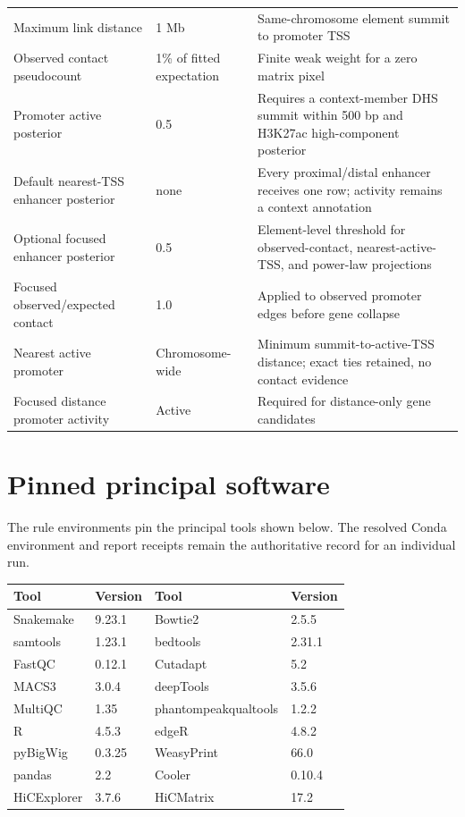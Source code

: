 \documentclass[11pt]{article}
\begin{document}
\begin{longtable}{p{} p{} p{}}
Maximum link distance & 1 Mb & Same-chromosome element summit to promoter TSS \\
Observed contact pseudocount & 1\% of fitted expectation & Finite weak weight for a zero matrix pixel \\
Promoter active posterior & 0.5 & Requires a context-member DHS summit within 500 bp and H3K27ac high-component posterior \\
Default nearest-TSS enhancer posterior & none & Every proximal/distal enhancer receives one row; activity remains a context annotation \\
Optional focused enhancer posterior & 0.5 & Element-level threshold for observed-contact, nearest-active-TSS, and power-law projections \\
Focused observed/expected contact & 1.0 & Applied to observed promoter edges before gene collapse \\
Nearest active promoter & Chromosome-wide & Minimum summit-to-active-TSS distance; exact ties retained, no contact evidence \\
Focused distance promoter activity & Active & Required for distance-only gene candidates \\
\bottomrule
\end{longtable}

\section{Pinned principal software}

The rule environments pin the principal tools shown below.  The resolved
Conda environment and report receipts remain the authoritative record for an
individual run.

\begin{center}
\begin{tabular}{ll@{\qquad}ll}
\toprule
Tool & Version & Tool & Version \\
\midrule
Snakemake & 9.23.1 & Bowtie2 & 2.5.5 \\
samtools & 1.23.1 & bedtools & 2.31.1 \\
FastQC & 0.12.1 & Cutadapt & 5.2 \\
MACS3 & 3.0.4 & deepTools & 3.5.6 \\
MultiQC & 1.35 & phantompeakqualtools & 1.2.2 \\
R & 4.5.3 & edgeR & 4.8.2 \\
pyBigWig & 0.3.25 & WeasyPrint & 66.0 \\
pandas & 2.2 & Cooler & 0.10.4 \\
HiCExplorer & 3.7.6 & HiCMatrix & 17.2 \\
\bottomrule
\end{tabular}
\end{center}
\end{document}
